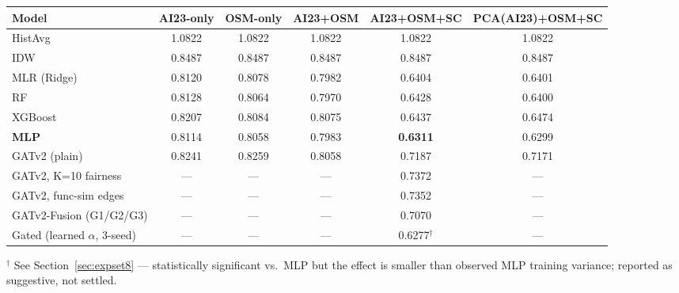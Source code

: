 \documentclass[11pt]{article}
\begin{document}
\begin{center}
\small
\begin{tabular}{@{}lccccc@{}}
\toprule
\textbf{Model} & \textbf{AI23-only} & \textbf{OSM-only} & \textbf{AI23+OSM} &
\textbf{AI23+OSM+SC} & \textbf{PCA(AI23)+OSM+SC} \\
\midrule
HistAvg & 1.0822 & 1.0822 & 1.0822 & 1.0822 & 1.0822 \\
IDW & 0.8487 & 0.8487 & 0.8487 & 0.8487 & 0.8487 \\
MLR (Ridge) & 0.8120 & 0.8078 & 0.7982 & 0.6404 & 0.6401 \\
RF & 0.8128 & 0.8064 & 0.7970 & 0.6428 & 0.6400 \\
XGBoost & 0.8207 & 0.8084 & 0.8075 & 0.6437 & 0.6474 \\
\textbf{MLP} & 0.8114 & 0.8058 & 0.7983 & \textbf{0.6311} & 0.6299 \\
GATv2 (plain) & 0.8241 & 0.8259 & 0.8058 & 0.7187 & 0.7171 \\
GATv2, K=10 fairness & --- & --- & --- & 0.7372 & --- \\
GATv2, func-sim edges & --- & --- & --- & 0.7352 & --- \\
GATv2-Fusion (G1/G2/G3) & --- & --- & --- & 0.7070 & --- \\
Gated (learned $\alpha$, 3-seed) & --- & --- & --- & 0.6277$^\dagger$ & --- \\
\bottomrule
\end{tabular}
\end{center}
{\footnotesize $^\dagger$ See Section~\ref{sec:expset8} --- statistically significant vs.\
MLP but the effect is smaller than observed MLP training variance; reported as suggestive,
not settled.}
\end{document}
